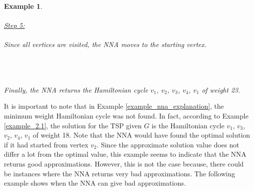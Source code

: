 \documentclass[12pt]{article}
\newtheorem{example}[definition]{Example}
\numberwithin{equation}{subsection}
\numberwithin{table}{subsection}
\numberwithin{algorithm}{subsection}
\begin{document}
\begin{example}
\\\\
\underline{Step 5:}\\\\
Since all vertices are visited, the NNA moves to the starting vertex.\\\\
\\\\
Finally, the NNA returns the Hamiltonian cycle $v_1$, $v_2$, $v_3$, $v_4$, $v_1$ of weight 23.
\end{example}
It is important to note that in Example \ref{example_nna_explanation}, the minimum weight Hamiltonian cycle was not found. In fact, according to Example \ref{example_2.1}, the solution for the TSP given $G$ is the Hamiltonian cycle $v_1$, $v_3$, $v_2$, $v_4$, $v_1$ of weight 18. Note that the NNA would have found the optimal solution if it had started from vertex $v_2$. Since the approximate solution value does not differ a lot from the optimal value, this example seems to indicate that the NNA returns good approximations. However, this is not the case because, there could be instances where the NNA returns very bad approximations. The following example shows when the NNA can give bad approximations.
\end{document}

